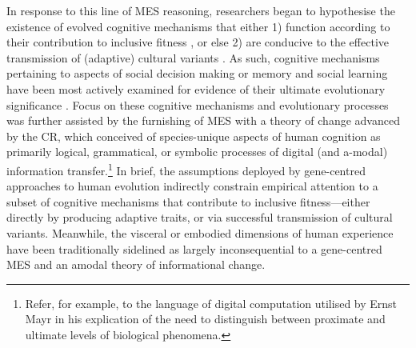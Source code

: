 \begin{CJK}{UTF8}{gbsn}
In response to this line of MES reasoning, researchers began to hypothesise the existence of evolved cognitive mechanisms that either 1) function according to their contribution to inclusive fitness \citep[an approach that has since matured into the field of evolutionary psychology][]{Cosmides1992}, or else 2) are conducive to the effective \citep[i.e. ``cumulative'' see][]{Tomasello1993} transmission of (adaptive) cultural variants \citep[an approach that has since matured into the field of cultural evolution; see][]{Cavalli-Sforza1981,Boyd1988}.
As such, cognitive mechanisms pertaining to aspects of social decision making \citep[in the case of game-theoretical models of cooperation, see][]{Cosmides1989,West2011} or memory and social learning \citep[in the case of gene-culture coevolutionary models][]{Henrich2003} have been most actively examined for evidence of their ultimate evolutionary significance \citep{Badcock2012}.  Focus on these cognitive mechanisms and evolutionary processes was further assisted by the furnishing of MES with a theory of change advanced by the CR, which conceived of species-unique aspects of human cognition as primarily logical, grammatical, or symbolic processes of digital (and a-modal) information transfer.\footnote{Refer, for example, to the language of digital computation utilised by Ernst Mayr in his explication of the need to distinguish between proximate and ultimate levels of biological phenomena\citep{Mayr1961}.}  In brief, the assumptions deployed by gene-centred approaches to human evolution indirectly constrain empirical attention to a subset of cognitive mechanisms that contribute to inclusive fitness---either directly by producing adaptive traits, or via successful transmission of cultural variants.  Meanwhile, the visceral or embodied dimensions of human experience have been traditionally sidelined as largely inconsequential to a gene-centred MES and an amodal theory of informational change.


\end{CJK}
